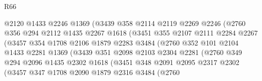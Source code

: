 \begin{lexlean}{R66}
\begin{coremodule}
                          @2120
                          @1433
                          @2246
                          @1369
                          (@3439
                            @358
                            @2114
                            @2119
                            @2269
                            @2246
                            (@2760
                              @356
                              @294
                              @2112
                              @1435
                              @2267
                              @1618
                              (@3451
                                @355
                                @2107
                                @2111
                                @2284
                                @2267
                                (@3457
                                  @354
                                  @1708
                                  @2106
                                  @1879
                                  @2283
                                  @3484
                                  (@2760
                                    @352
                                    @101
                                    @2104
                                    @1433
                                    @2281
                                    @1369
                                    (@3439
                                      @351
                                      @2098
                                      @2103
                                      @2304
                                      @2281
                                      (@2760
                                        @349
                                        @294
                                        @2096
                                        @1435
                                        @2302
                                        @1618
                                        (@3451
                                          @348
                                          @2091
                                          @2095
                                          @2317
                                          @2302
                                          (@3457
                                            @347
                                            @1708
                                            @2090
                                            @1879
                                            @2316
                                            @3484
                                            (@2760

\end{coremodule}
\end{lexlean}
